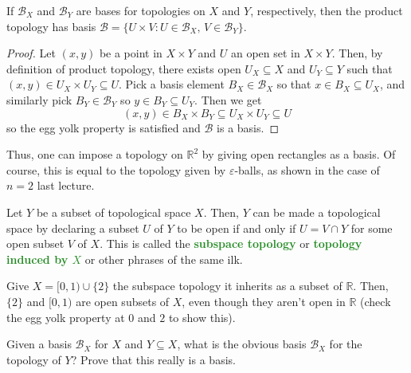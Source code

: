 \documentclass[11pt]{scrartcl}
\providecommand{\eps}{\varepsilon}
\providecommand{\RR}{\mathbb R}
\providecommand{\vocab}[1]{{\textbf{\textcolor{ForestGreen}{#1}}}}
\begin{document}
\begin{lemma}
    \label{lem:prodofbases}
    If $\mathcal B_X$ and $\mathcal B_Y$ are bases for
    topologies on $X$ and $Y$, respectively, then
    the product topology has basis
    $\mathcal B = \{U\times V : U\in\mathcal B_X,\,V\in\mathcal B_Y\}.$
\end{lemma}

\begin{proof}
    Let $(x,y)$ be a point in $X\times Y$ and $U$ an open set in $X\times Y$.
    Then, by definition of product topology, there exists open $U_X\subseteq X$
    and $U_Y\subseteq Y$ such that $(x,y)\in U_X\times U_Y\subseteq U$.
    Pick a basis element $B_X\in\mathcal B_X$ so that
    $x\in B_X\subseteq U_X$, and similarly pick $B_Y\in\mathcal B_Y$ so
    $y\in B_Y\subseteq U_Y$. Then we get
    \begin{equation*}
	(x,y)\in B_X\times B_Y\subseteq U_X\times U_Y\subseteq U
    \end{equation*}
    so the egg yolk property is satisfied and $\mathcal B$ is a basis.
\end{proof}

Thus, one can impose a topology on $\RR^2$ by giving open rectangles as a basis.
Of course, this is equal to the topology given by $\eps$-balls,
as shown in the case of $n=2$ last lecture.

\begin{definition}
    \label{def:subpsace}
    Let $Y$ be a subset of topological space $X$.
    Then, $Y$ can be made a topological space
    by declaring a subset $U$ of $Y$ to be open
    if and only if $U = V\cap Y$ for some open subset $V$ of $X$.
    This is called the \vocab{subspace topology}
    or \vocab{topology induced by $X$} or other phrases of the same ilk.
\end{definition}

\begin{example}
    Give $X = [0,1)\cup\{2\}$ the subspace topology it inherits
    as a subset of $\RR$.
    Then, $\{2\}$ and $[0,1)$ are open subsets of $X$,
    even though they aren't open in $\RR$
    (check the egg yolk property at $0$ and $2$ to show this).
\end{example}

\begin{exercise}
    Given a basis $\mathcal B_X$ for $X$ and $Y\subseteq X$,
    what is the obvious basis $\mathcal B_X$ for the topology of $Y$?
    Prove that this really is a basis.
\end{exercise}
\end{document}
